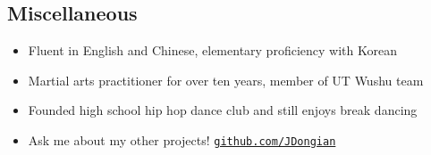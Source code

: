 \documentclass[line,margin]{res}
\begin{document}
\begin{resume}
\vspace{-8pt}
\section{Miscellaneous} 
\vspace{22pt}
    \begin{itemize} \itemsep -2pt %
    \item Fluent in English and Chinese, elementary proficiency with Korean
    \item Martial arts practitioner for over ten years, member of UT Wushu team
    \item Founded high school hip hop dance club and still enjoys break dancing
    \item Ask me about my other projects! \href{https://www.github.com/JDongian}{\texttt{github.com/JDongian}}
    \end{itemize}

\end{resume} 
\end{document}
